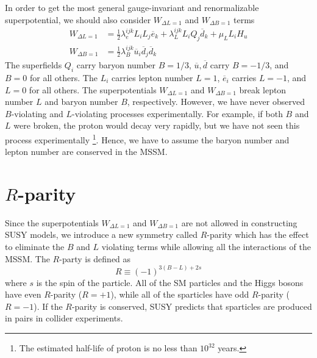 \documentclass[12pt]{report}
\begin{document}
In order to get the most general gauge-invariant and renormalizable  superpotential, we should also consider $W_{\Delta L = 1}$ and $W_{\Delta B = 1}$ terms
\begin{align}
W_{\Delta L = 1} &= \frac{1}{2} \lambda^{ijk}_{e} L_{i} L_{j} \overline{e}_{k} + \lambda^{ijk}_{L} L_{i} Q_{j} \overline{d}_{k} + \mu_{L} L_{i} H_{u} \label{eq: superpotential violate L}\\
W_{\Delta B = 1} &= \frac{1}{2} \lambda^{ijk}_{B} \overline{u}_{i} \overline{d}_{j} \overline{d}_{k} \label{eq: superpotential violate B}
\end{align}
The superfields $Q_{i}$ carry baryon number $B = 1/3$, $\overline{u}, \overline{d}$ carry $B = -1/3$, and $B = 0$ for all others.
The $L_{i}$ carries lepton number $L = 1$, $\overline{e}_{i}$ carries $L = -1$, and $L = 0$ for all others.
The superpotentials $W_{\Delta L = 1}$ and $W_{\Delta B = 1}$  break lepton number $L$ and baryon number $B$, respectively.
However, we have never observed $B$-violating and $L$-violating processes experimentally.
For example, if both $B$ and $L$ were broken, the proton would decay very rapidly, but we have not seen this process experimentally \footnote{The estimated half-life of proton is no less than $10^{32}$ years.}.
Hence, we have to assume the baryon number and lepton number are conserved in the MSSM.



\section{$R$-parity}
Since the superpotentials $W_{\Delta L = 1}$ and $W_{\Delta B = 1}$ are not allowed in constructing SUSY models, we introduce a new symmetry called $R$-parity which has the effect to eliminate the $B$ and $L$ violating terms while allowing all the interactions of the MSSM.
The $R$-party is defined as
\begin{equation}
R \equiv (-1)^{3(B - L) + 2s}
\end{equation}
where $s$ is the spin of the particle. All of the SM particles and the Higgs bosons have even $R$-parity ($R = +1$), while all of the sparticles have odd $R$-parity ($R = -1$).
If the $R$-parity is conserved, SUSY predicts that sparticles are produced in pairs in collider experiments.
\end{document}
